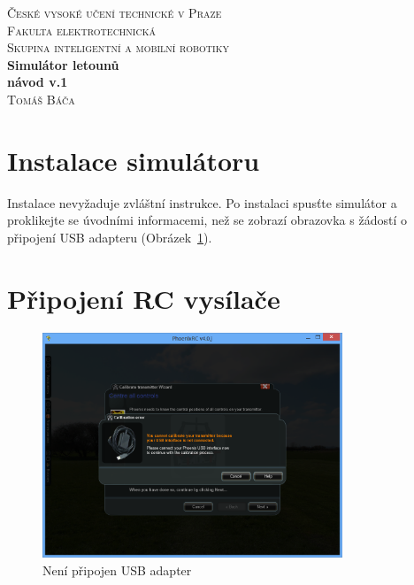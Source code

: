 \documentclass[11pt, a4paper]{article}
\newcommand{\Author}{Tomáš Báča}
\begin{document}
\begin{titlepage}

\begin{center}

\textsc{\LARGE České vysoké učení technické v Praze }\\[1.0cm]
\textsc{\LARGE Fakulta elektrotechnická }\\[1.0cm]
\textsc{\large Skupina inteligentní a mobilní robotiky }\\[0.5cm]

{ \huge \bfseries Simulátor letounů\\[0.5cm] návod v.1 }\\[1.0cm]

\large
\textsc{\Author}

\vfill

\end{center}

\end{titlepage}

\newpage

\tableofcontents

\newpage

\setlength{\parskip}{0.35cm}
\lhead{\emph{\leftmark}}
\rhead{}
\cfoot{}
\rfoot{\thepage$/$\pageref{LastPage}}

\section{Instalace simulátoru}

Instalace nevyžaduje zvláštní instrukce. Po instalaci spusťte simulátor a proklikejte se úvodními informacemi, než se zobrazí obrazovka s žádostí o připojení USB adapteru (Obrázek~\ref{fig:obr1}).

\section{Připojení RC vysílače}

\begin{figure}[h]
\begin{center}
\includegraphics[width=0.8\textwidth]{fig/1.PNG}
\caption{Není připojen USB adapter}
\label{fig:obr1}
\end{center}
\end{figure}
\end{document}
